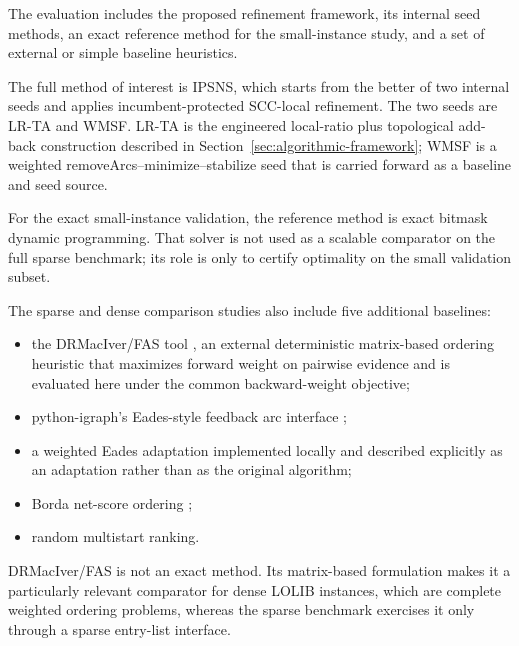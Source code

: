 The evaluation includes the proposed refinement framework, its internal seed methods, an exact reference method for the small-instance study, and a set of external or simple baseline heuristics.

The full method of interest is IPSNS, which starts from the better of two internal seeds and applies incumbent-protected SCC-local refinement. The two seeds are LR-TA and WMSF. LR-TA is the engineered local-ratio plus topological add-back construction described in Section~\ref{sec:algorithmic-framework}; WMSF is a weighted removeArcs--minimize--stabilize seed that is carried forward as a baseline and seed source.

For the exact small-instance validation, the reference method is exact bitmask dynamic programming. That solver is not used as a scalable comparator on the full sparse benchmark; its role is only to certify optimality on the small validation subset.

The sparse and dense comparison studies also include five additional baselines:
\begin{itemize}
    \item the DRMacIver/FAS tool \cite{drmaciver_feedback_arc_set}, an external deterministic matrix-based ordering heuristic that maximizes forward weight on pairwise evidence and is evaluated here under the common backward-weight objective;
    \item python-igraph's Eades-style feedback arc interface \cite{python_igraph_feedback_arc_set};
    \item a weighted Eades adaptation implemented locally and described explicitly as an adaptation rather than as the original \cite{ELS93} algorithm;
    \item Borda net-score ordering \cite{CFR10};
    \item random multistart ranking.
\end{itemize}

DRMacIver/FAS is not an exact method. Its matrix-based formulation makes it a particularly relevant comparator for dense LOLIB instances, which are complete weighted ordering problems, whereas the sparse benchmark exercises it only through a sparse entry-list interface.

